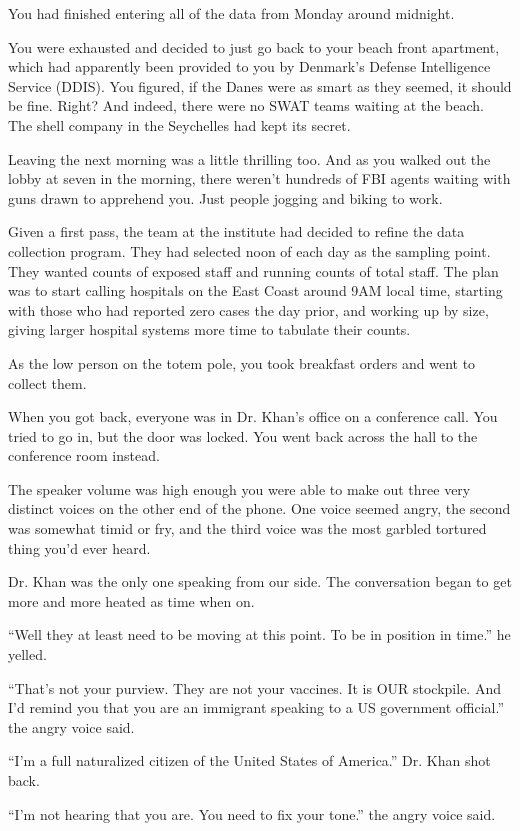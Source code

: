 \documentclass[17pt, twoside, a5paper, openright, extrafontsizes]{memoir}
\begin{document}
You had finished entering all of the data from Monday around midnight.

You were exhausted and decided to just go back to your beach front
apartment, which had apparently been provided to you by Denmark's
Defense Intelligence Service (DDIS). You figured, if the Danes were as
smart as they seemed, it should be fine. Right? And indeed, there were
no SWAT teams waiting at the beach. The shell company in the Seychelles
had kept its secret.

Leaving the next morning was a little thrilling too. And as you walked
out the lobby at seven in the morning, there weren't hundreds of FBI
agents waiting with guns drawn to apprehend you. Just people jogging and
biking to work.

Given a first pass, the team at the institute had decided to refine the
data collection program. They had selected noon of each day as the
sampling point. They wanted counts of exposed staff and running counts
of total staff. The plan was to start calling hospitals on the East
Coast around 9AM local time, starting with those who had reported zero
cases the day prior, and working up by size, giving larger hospital
systems more time to tabulate their counts.

As the low person on the totem pole, you took breakfast orders and went
to collect them.

When you got back, everyone was in Dr. Khan's office on a conference
call. You tried to go in, but the door was locked. You went back across
the hall to the conference room instead.

The speaker volume was high enough you were able to make out three very
distinct voices on the other end of the phone. One voice seemed angry,
the second was somewhat timid or fry, and the third voice was the most
garbled tortured thing you'd ever heard.

Dr. Khan was the only one speaking from our side. The conversation began
to get more and more heated as time when on.

``Well they at least need to be moving at this point. To be in position
in time.'' he yelled.

``That's not your purview. They are not your vaccines. It is OUR
stockpile. And I'd remind you that you are an immigrant speaking to a US
government official.'' the angry voice said.

``I'm a full naturalized citizen of the United States of America.''
Dr. Khan shot back.

``I'm not hearing that you are. You need to fix your tone.'' the angry
voice said.
\end{document}
